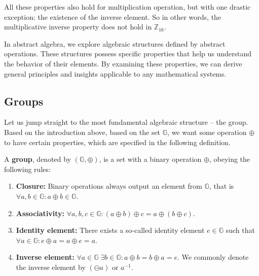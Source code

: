 \documentclass[../lecture-notes-148x210.tex]{subfiles}
\begin{document}
\vspace{-4mm}

\begin{remark}
    All these properties also hold for multiplication operation, but with one 
    drastic exception: the existence of the inverse element. So in other words, the multiplicative 
    inverse property does not hold in $\mathbb{Z}_{16}$.
\end{remark}

\vspace{-1.3mm}

In abstract algebra, we explore algebraic structures defined by abstract operations. These 
structures possess specific properties that help us understand the behavior of their elements.
By examining these properties, we can derive general principles and insights applicable to 
any mathematical systems.

\subsection{Groups}

Let us jump straight to the most fundamental algebraic structure -- the group. Based on the introduction 
above, based on the set $\mathbb{G}$, we want some operation $\oplus$ to have certain properties, which 
are specified in the following definition.

\begin{definition}
    A \textbf{group}, denoted by $(\mathbb{G}, \oplus)$, is a set with a binary operation $\oplus$, obeying the following rules:
    \begin{enumerate}
        \item \textbf{Closure:} Binary operations always output an element from $\mathbb{G}$, that is $\forall a,b \in \mathbb{G}: a \oplus b \in \mathbb{G}$.
        \item \textbf{Associativity:} $\forall a,b,c \in \mathbb{G}: (a \oplus b)\oplus c = a \oplus (b \oplus c)$.
        \item \textbf{Identity element:} There exists a so-called identity element $e \in \mathbb{G}$ such that $\forall a \in \mathbb{G}: e \oplus a = a \oplus e = a$.
        \item \textbf{Inverse element:} $\forall a \in \mathbb{G} \; \exists b \in \mathbb{G}: a\oplus b = b \oplus a = e$. We commonly denote the inverse element by $(\ominus a)$ or $a^{-1}$.
    \end{enumerate}
\end{definition}
\end{document}
